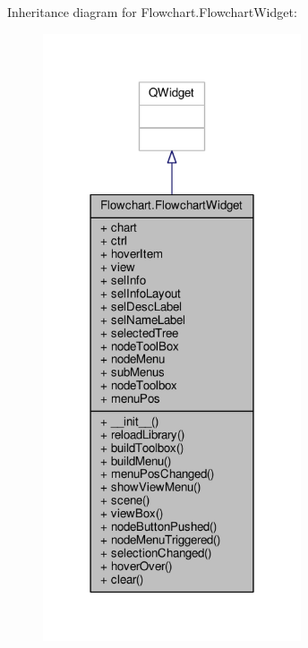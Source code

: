 Inheritance diagram for Flowchart.\+Flowchart\+Widget\+:\nopagebreak
\begin{figure}[H]
\begin{center}
\leavevmode
\includegraphics[width=216pt]{d0/dc3/classFlowchart_1_1FlowchartWidget__inherit__graph}
\end{center}
\end{figure}


